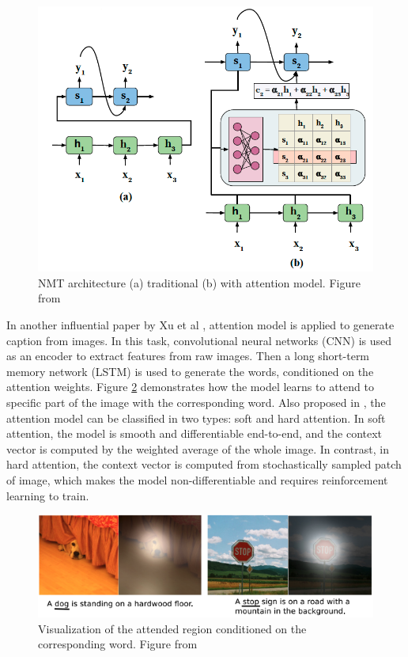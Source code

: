 \documentclass[journal]{IEEEtran}
\begin{document}
\begin{figure}[htb]
  \centering
  \includegraphics[width=0.7\columnwidth]{NMT.png}
  \caption{NMT architecture (a) traditional (b) with attention model.
  Figure from \cite{chaudhari1904attentive}}
  \label{NMT}
\end{figure}

In another influential paper by Xu et al \cite{xu2015show}, attention model is applied to generate caption from images. 
In this task, convolutional neural networks (CNN) is used as an encoder to extract features from raw images.
Then a long short-term memory network (LSTM) is used to generate the words, conditioned on the attention weights.
Figure \ref{attention} demonstrates how the model learns to attend to specific part of the image with the corresponding word. 
Also proposed in \cite{xu2015show}, the attention model can be classified in two types: soft and hard attention. 
In soft attention, the model is smooth and differentiable end-to-end, and the context vector is computed by the weighted average of the whole image. 
In contrast, in hard attention, the context vector is computed from stochastically sampled patch of image, 
which makes the model non-differentiable and requires reinforcement learning to train.

\begin{figure}[htb]
  \includegraphics[width=\linewidth]{attention.png}
  \caption{Visualization of the attended region conditioned on the corresponding word.
  Figure from \cite{xu2015show}}
  \label{attention}
\end{figure}
\end{document}
